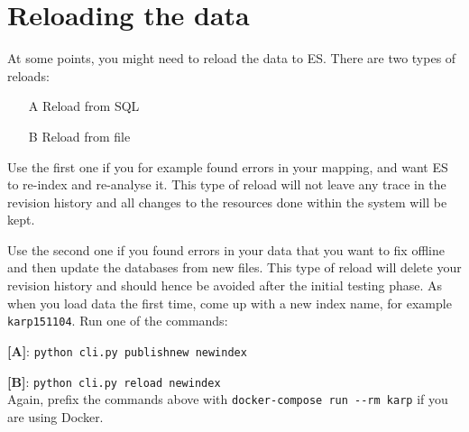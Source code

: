 \documentclass[
12pt, %
a4paper, %
oneside, %
headinclude,footinclude, %
BCOR0mm, %
]{scrartcl}
\begin{document}
%
%
%
%

\section{Reloading the data}
\label{sec:reload}
At some points, you might need to reload the data to ES.\@
There are two types of reloads:
\begin{itemize}
  \item[A] Reload from SQL
  \item[B] Reload from file
\end{itemize}

Use the first one if you for example found errors in your mapping, and
want ES to re-index and re-analyse it. This type of reload will not leave
any trace in the revision history and all changes to the resources done
within the system will be kept.

Use the second one if you found errors in your data that you want
to fix offline and then update the databases from new files. This type
of reload will delete your revision history and should hence be avoided
after the initial testing phase.
As when you load data the first time, come up with a new index name,
for example \verb|karp151104|.
Run one of the commands:

\textbf{[A]}:
\verb|python cli.py publishnew newindex|

\textbf{[B]}:
\verb|python cli.py reload newindex|\\
Again, prefix the commands above with
\verb|docker-compose run --rm karp|
if you are using Docker.
\end{document}
